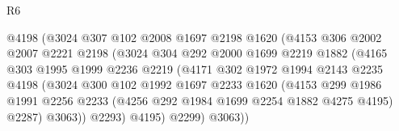 \begin{lexlean}{R6}
\begin{coremodule}
                                  @4198
                                  (@3024
                                    @307
                                    @102
                                    @2008
                                    @1697
                                    @2198
                                    @1620
                                    (@4153
                                      @306
                                      @2002
                                      @2007
                                      @2221
                                      @2198
                                      (@3024
                                        @304
                                        @292
                                        @2000
                                        @1699
                                        @2219
                                        @1882
                                        (@4165
                                          @303
                                          @1995
                                          @1999
                                          @2236
                                          @2219
                                          (@4171
                                            @302
                                            @1972
                                            @1994
                                            @2143
                                            @2235
                                            @4198
                                            (@3024
                                              @300
                                              @102
                                              @1992
                                              @1697
                                              @2233
                                              @1620
                                              (@4153
                                                @299
                                                @1986
                                                @1991
                                                @2256
                                                @2233
                                                (@4256 @292 @1984 @1699 @2254 @1882 @4275 @4195)
                                                @2287)
                                              @3063))
                                          @2293)
                                        @4195)
                                      @2299)
                                    @3063))

\end{coremodule}
\end{lexlean}
